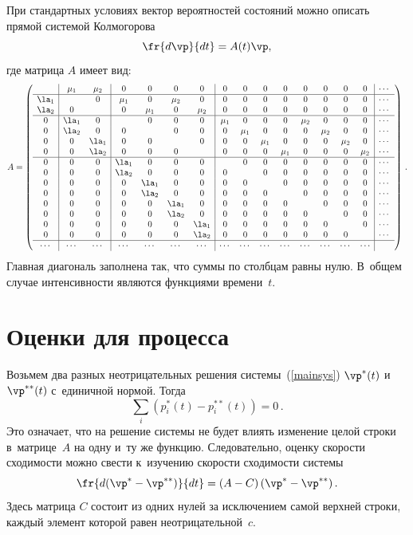 При стандартных условиях вектор вероятностей состояний можно описать прямой системой Колмогорова
\begin{equation}
\fr{d\vp}{dt}=A(t)\vp,
\label{mainsys}
\end{equation}
где матрица $A$ имеет вид:
\begin{equation}
A=
\left(\begin{array}{c|cc|cccc|cccccccc|c}
& {\mu_1} & {\mu_2} & 0 & 0 & 0 & 0 & 0 & 0 & 0 & 0 & 0 & 0 & 0 & 0 & \cdots\cr
\hline
{\la_1} &  & 0 & {\mu_1} & 0 & {\mu_2} & 0 & 0 & 0 & 0 & 0 & 0 & 0 & 0 & 0& \cdots\cr
{\la_2} & 0 &  & 0 & {\mu_1} & 0 & {\mu_2} & 0 & 0 & 0 & 0 & 0 & 0 & 0 & 0& \cdots\cr
\hline
0 & {\la_1} & 0 &  & 0 & 0 & 0 & {\mu_1} & 0 & 0 & 0 & {\mu_2} & 0 & 0 & 0& \cdots\cr
0 & {\la_2} & 0 & 0 &   & 0 & 0 & 0 & {\mu_1} & 0 & 0 & 0 & {\mu_2} & 0 & 0& \cdots\cr
0 & 0 & {\la_1} & 0 & 0 &   & 0 & 0 & 0 & {\mu_1} & 0 & 0 & 0 & {\mu_2} & 0& \cdots\cr
0 & 0 & {\la_2} & 0 & 0 & 0 &   & 0 & 0 & 0 & {\mu_1} & 0 & 0 & 0 & {\mu_2}& \cdots\cr
\hline
0 & 0 & 0 & {\la_1} & 0 & 0 & 0 &   & 0 & 0 & 0 & 0 & 0 & 0 & 0& \cdots\cr
0 & 0 & 0 & {\la_2} & 0 & 0 & 0 & 0 &   & 0 & 0 & 0 & 0 & 0 & 0& \cdots\cr
0 & 0 & 0 & 0 & {\la_1} & 0 & 0 & 0 & 0 &   & 0 & 0 & 0 & 0 & 0& \cdots\cr
0 & 0 & 0 & 0 & {\la_2} & 0 & 0 & 0 & 0 & 0 &   & 0 & 0 & 0 & 0& \cdots\cr
0 & 0 & 0 & 0 & 0 & {\la_1} & 0 & 0 & 0 & 0 & 0 &   & 0 & 0 & 0& \cdots\cr
0 & 0 & 0 & 0 & 0 & {\la_2} & 0 & 0 & 0 & 0 & 0 & 0 &   & 0 & 0& \cdots\cr
0 & 0 & 0 & 0 & 0 & 0 & {\la_1} & 0 & 0 & 0 & 0 & 0 & 0 &   & 0& \cdots\cr
0 & 0 & 0 & 0 & 0 & 0 & {\la_2} & 0 & 0 & 0 & 0 & 0 & 0 & 0 &  & \cdots\cr
\hline
\cdots& \cdots& \cdots& \cdots& \cdots& \cdots& \cdots& \cdots& \cdots& \cdots& 
\cdots& \cdots& \cdots& \cdots& \cdots \end{array}\right)\,.
\end{equation}
Главная диагональ заполнена так, что суммы по столбцам равны нулю. 
В~общем случае интенсивности являются функциями времени~$t$.

\section{Оценки для процесса~{}}
\label{ch5ne1a}

Возьмем два разных неотрицательных решения системы~(\ref{mainsys})   
$\vp^*(t)$ и~$\vp^{**}(t)$ с~единичной нормой. Тогда 
$$
\sum\limits_{i} (p^*_i(t)- p^{**}_i(t))= 0\,.
$$
 Это означает, что на решение системы не будет влиять изменение 
целой строки в~матрице~$A$ на одну и~ту же функцию.
Следовательно, оценку скорости сходимости можно свести к~изучению скорости сходимости системы
\begin{equation*}
\fr{d(\vp^*-\vp^{**})}{dt}=(A-C)\left(\vp^*-\vp^{**}\right).
\end{equation*}
Здесь матрица $C$ состоит из одних нулей за исключением самой верхней 
строки, каждый элемент которой равен неотрицательной~$c$.

